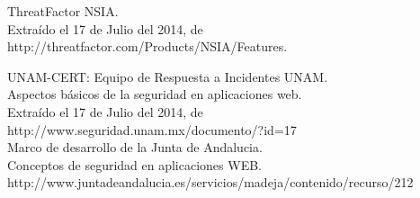 \documentclass[letter,twoside,11pt]{article}
\begin{document}
\begin{thebibliography}{99}
     ThreatFactor NSIA.\\
    Extraído el 17 de Julio del 2014, de\\
    http://threatfactor.com/Products/NSIA/Features.

     UNAM-CERT: Equipo de Respuesta a Incidentes UNAM.\\
    Aspectos básicos de la seguridad en aplicaciones web.\\
    Extraído el 17 de Julio del 2014, de\\
    http://www.seguridad.unam.mx/documento/?id=17\\

     Marco de desarrollo de la Junta de Andalucia.\\
    Conceptos de seguridad en aplicaciones WEB.\\
    http://www.juntadeandalucia.es/servicios/madeja/contenido/recurso/212\\
\end{thebibliography}
\end{document}
